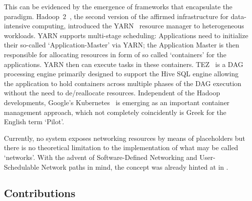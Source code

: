 \documentclass{sig-alternate}
\begin{document}
This can be evidenced by the emergence of frameworks that encapsulate the \pilot
paradigm. Hadoop~2~\cite{hadoop_url}, the second version of the affirmed
infrastructure for data-intensive computing,
introduced the YARN~\cite{vavilapalli2013apache} resource manager to
heterogeneous workloads.
YARN supports multi-stage scheduling: Applications need to initialize their
so-called `Application-Master' via YARN; the Application Master is then
responsible for allocating resources in form of so called `containers' for the
applications. YARN then can execute tasks in these containers.
TEZ~\cite{tez_url} is a DAG processing engine primarily designed to support the
Hive SQL engine allowing the application to hold containers across multiple
phases of the DAG execution without the need to de/reallocate
resources.
Independent of the Hadoop developments, Google's
Kubernetes~\cite{bernstein2014containers} is emerging as an important container
management approach, which not completely coincidently is Greek for the English
term `Pilot'.

Currently, no \pilot system exposes networking resources by means of
placeholders but there is no theoretical limitation to the implementation of
what may be called `\pilot networks'. With the advent of Software-Defined
Networking and User-Schedulable Network paths in mind, the concept was already
hinted at in \cite{santcroos2012}.


%
\subsection{Contributions}
\label{sec:contributions}

\end{document}
